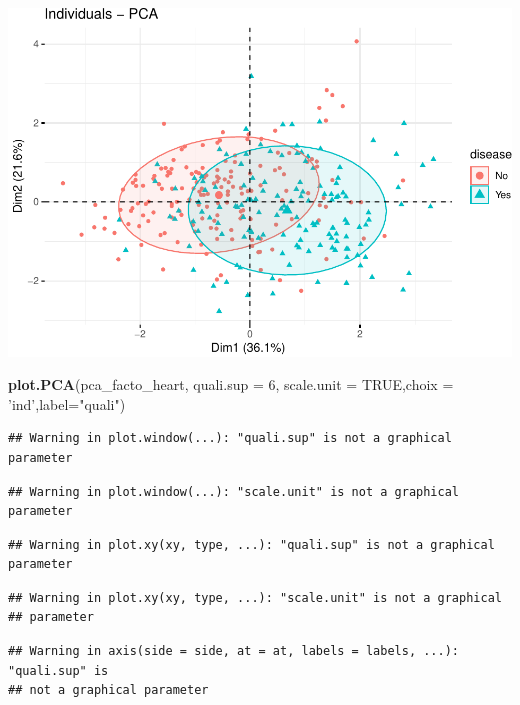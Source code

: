 \documentclass[]{article}
\newenvironment{Shaded}{\begin{snugshade}}{\end{snugshade}}
\newcommand{\KeywordTok}[1]{\textcolor[rgb]{0.13,0.29,0.53}{\textbf{#1}}}
\newcommand{\DataTypeTok}[1]{\textcolor[rgb]{0.13,0.29,0.53}{#1}}
\newcommand{\DecValTok}[1]{\textcolor[rgb]{0.00,0.00,0.81}{#1}}
\newcommand{\StringTok}[1]{\textcolor[rgb]{0.31,0.60,0.02}{#1}}
\newcommand{\OtherTok}[1]{\textcolor[rgb]{0.56,0.35,0.01}{#1}}
\newcommand{\NormalTok}[1]{#1}
\begin{document}
\includegraphics{project_report_files/figure-latex/unnamed-chunk-9-1.pdf}

\begin{Shaded}
\begin{Highlighting}[]
\KeywordTok{plot.PCA}\NormalTok{(pca_facto_heart, }\DataTypeTok{quali.sup =} \DecValTok{6}\NormalTok{, }\DataTypeTok{scale.unit =} \OtherTok{TRUE}\NormalTok{,}\DataTypeTok{choix =} \StringTok{'ind'}\NormalTok{,}\DataTypeTok{label=}\StringTok{"quali"}\NormalTok{)}
\end{Highlighting}
\end{Shaded}

\begin{verbatim}
## Warning in plot.window(...): "quali.sup" is not a graphical parameter
\end{verbatim}

\begin{verbatim}
## Warning in plot.window(...): "scale.unit" is not a graphical parameter
\end{verbatim}

\begin{verbatim}
## Warning in plot.xy(xy, type, ...): "quali.sup" is not a graphical parameter
\end{verbatim}

\begin{verbatim}
## Warning in plot.xy(xy, type, ...): "scale.unit" is not a graphical
## parameter
\end{verbatim}

\begin{verbatim}
## Warning in axis(side = side, at = at, labels = labels, ...): "quali.sup" is
## not a graphical parameter
\end{verbatim}
\end{document}
